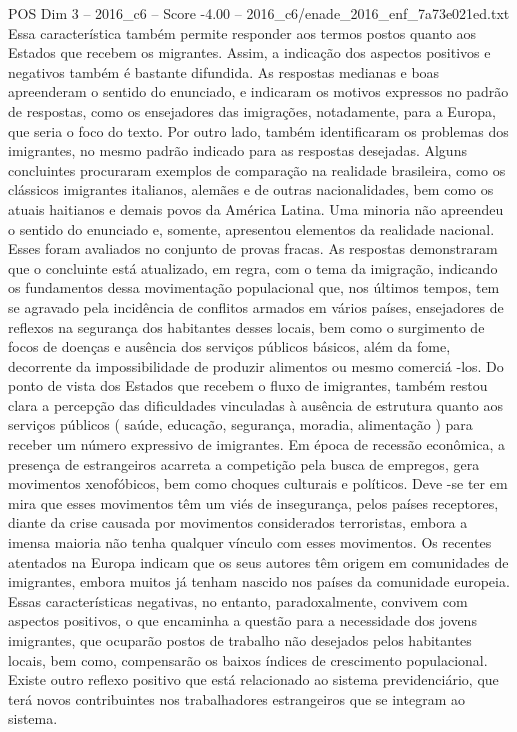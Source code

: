 \begin{textsample}{POS Dim 3 – 2016\_c6 – Score -4.00 – 2016\_c6/enade\_2016\_enf\_7a73e021ed.txt}
Essa característica também permite responder aos termos postos quanto aos Estados que recebem os migrantes.
Assim, a indicação dos aspectos positivos e negativos também é bastante difundida.
As respostas medianas e boas apreenderam o sentido do enunciado, e indicaram os motivos expressos no padrão de respostas, como os ensejadores das imigrações, notadamente, para a Europa, que seria o foco do texto.
Por outro lado, também identificaram os problemas dos imigrantes, no mesmo padrão indicado para as respostas desejadas.
Alguns concluintes procuraram exemplos de comparação na realidade brasileira, como os clássicos imigrantes italianos, alemães e de outras nacionalidades, bem como os atuais haitianos e demais povos da América Latina.
Uma minoria não apreendeu o sentido do enunciado e, somente, apresentou elementos da realidade nacional.
Esses foram avaliados no conjunto de provas fracas.
As respostas demonstraram que o concluinte está atualizado, em regra, com o tema da imigração, indicando os fundamentos dessa movimentação populacional que, nos últimos tempos, tem se agravado pela incidência de conflitos armados em vários países, ensejadores de reflexos na segurança dos habitantes desses locais, bem como o surgimento de focos de doenças e ausência dos serviços públicos básicos, além da fome, decorrente da impossibilidade de produzir alimentos ou mesmo comerciá -los.
Do ponto de vista dos Estados que recebem o fluxo de imigrantes, também restou clara a percepção das dificuldades vinculadas à ausência de estrutura quanto aos serviços públicos ( saúde, educação, segurança, moradia, alimentação ) para receber um número expressivo de imigrantes.
Em época de recessão econômica, a presença de estrangeiros acarreta a competição pela busca de empregos, gera movimentos xenofóbicos, bem como choques culturais e políticos.
Deve -se ter em mira que esses movimentos têm um viés de insegurança, pelos países receptores, diante da crise causada por movimentos considerados terroristas, embora a imensa maioria não tenha qualquer vínculo com esses movimentos.
Os recentes atentados na Europa indicam que os seus autores têm origem em comunidades de imigrantes, embora muitos já tenham nascido nos países da comunidade europeia.
Essas características negativas, no entanto, paradoxalmente, convivem com aspectos positivos, o que encaminha a questão para a necessidade dos jovens imigrantes, que ocuparão postos de trabalho não desejados pelos habitantes locais, bem como, compensarão os baixos índices de crescimento populacional.
Existe outro reflexo positivo que está relacionado ao sistema previdenciário, que terá novos contribuintes nos trabalhadores estrangeiros que se integram ao sistema.

\end{textsample}
